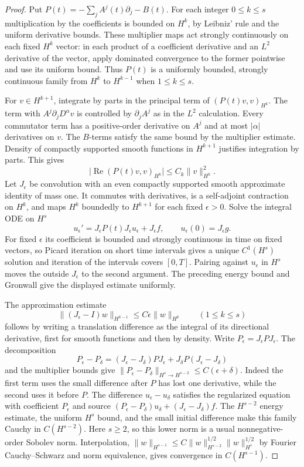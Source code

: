 \documentclass[11pt,oneside,openany]{book}
\theoremstyle{plain}
\theoremstyle{definition}
\theoremstyle{remark}
\begin{document}
\begin{proof}
Put \(P(t)=-\sum_j A^j(t)\partial_j-B(t)\).
For each integer \(0\leq k\leq s\) multiplication by the
coefficients is bounded on \(H^k\), by Leibniz' rule and the
uniform derivative bounds. These multiplier maps act strongly
continuously on each fixed \(H^k\) vector: in each product of a
coefficient derivative and an \(L^2\) derivative of the vector,
apply dominated convergence to the former pointwise and use its
uniform bound. Thus \(P(t)\) is a uniformly bounded, strongly
continuous family from \(H^k\) to \(H^{k-1}\) when \(1\leq k\leq s\).

For \(v\in H^{k+1}\), integrate by parts in the principal term
of \((P(t)v,v)_{H^k}\). The term with \(A^j\partial_jD^\alpha v\)
is controlled by \(\partial_j A^j\) as in the \(L^2\) calculation.
Every commutator term has a positive-order derivative on \(A^j\)
and at most \(|\alpha|\) derivatives on \(v\). The \(B\)-terms
satisfy the same bound by the multiplier estimate. Density of
compactly supported smooth functions in \(H^{k+1}\) justifies
integration by parts. This gives
\[
 \big|\operatorname{Re}(P(t)v,v)_{H^k}\big|
                 \leq C_k\|v\|_{H^k}^2 .
\]
Let \(J_\epsilon\) be convolution with an even compactly supported
smooth approximate identity of mass one. It commutes with
derivatives, is a self-adjoint contraction on \(H^k\), and maps
\(H^k\) boundedly to \(H^{k+1}\) for each fixed \(\epsilon>0\).
Solve the integral ODE on \(H^s\)
\[
 u_\epsilon'=J_\epsilon P(t)J_\epsilon u_\epsilon+
                 J_\epsilon f,\qquad u_\epsilon(0)=J_\epsilon g .
\]
For fixed \(\epsilon\) its coefficient is bounded and strongly
continuous in time on fixed vectors, so Picard iteration on
short time intervals gives a unique \(C^1(H^s)\) solution and
iteration of the intervals covers \([0,T]\).
Pairing against \(u_\epsilon\) in \(H^s\) moves the outside
\(J_\epsilon\) to the second argument. The preceding energy
bound and Gronwall give the displayed estimate uniformly.

The approximation estimate
\[
 \|(J_\epsilon-I)w\|_{H^{k-1}}\leq C\epsilon\|w\|_{H^k}
                    \qquad(1\leq k\leq s)
\]
follows by writing a translation difference as the integral of
its directional derivative, first for smooth functions and then
by density. Write \(P_\epsilon=J_\epsilon P J_\epsilon\).
The decomposition
\[
 P_\epsilon-P_\delta
   =(J_\epsilon-J_\delta)P J_\epsilon
       +J_\delta P(J_\epsilon-J_\delta)
\]
and the multiplier bounds give
\(\|P_\epsilon-P_\delta\|_{H^s\to H^{s-2}}
   \leq C(\epsilon+\delta)\).
Indeed the first term uses the small difference after \(P\)
has lost one derivative, while the second uses it before \(P\).
The difference \(u_\epsilon-u_\delta\) satisfies the regularized
equation with coefficient \(P_\epsilon\) and source
\((P_\epsilon-P_\delta)u_\delta+(J_\epsilon-J_\delta)f\).
The \(H^{s-2}\) energy estimate, the uniform \(H^s\) bound, and
the small initial difference make this family Cauchy in
\(C(H^{s-2})\). Here \(s\geq2\), so this lower norm is a usual
nonnegative-order Sobolev norm. Interpolation,
\(\|w\|_{H^{s-1}}\leq C\|w\|_{H^{s-2}}^{1/2}\|w\|_{H^s}^{1/2}\)
by Fourier Cauchy--Schwarz and norm equivalence, gives convergence
in \(C(H^{s-1})\).


\end{proof}
\end{document}
